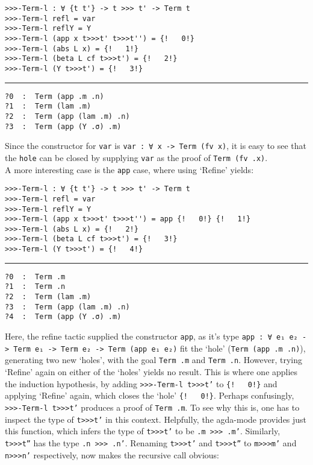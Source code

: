 \documentclass[a4paper, 12pt, twoside]{style/ociamthesis}
\let\OldTexttt\texttt
\renewcommand{\texttt}[1]{\small\OldTexttt{#1}}
\begin{document}
\begin{verbatim}
>>>-Term-l : ∀ {t t'} -> t >>> t' -> Term t
>>>-Term-l refl = var
>>>-Term-l reflY = Y
>>>-Term-l (app x t>>>t' t>>>t'') = {!   0!}
>>>-Term-l (abs L x) = {!   1!}
>>>-Term-l (beta L cf t>>>t') = {!   2!}
>>>-Term-l (Y t>>>t') = {!   3!}
\end{verbatim}

\noindent\rule{8cm}{0.4pt}

\begin{verbatim}
?0  :  Term (app .m .n)
?1  :  Term (lam .m)
?2  :  Term (app (lam .m) .n)
?3  :  Term (app (Y .σ) .m)
\end{verbatim}

Since the constructor for \texttt{var} is
\texttt{var : ∀ {x} -> Term (fv x)}, it is easy to see that the
\texttt{hole} can be closed by supplying \texttt{var} as the proof of
\texttt{Term (fv .x)}.\\
A more interesting case is the \texttt{app} case, where using `Refine'
yields:

\begin{verbatim}
>>>-Term-l : ∀ {t t'} -> t >>> t' -> Term t
>>>-Term-l refl = var
>>>-Term-l reflY = Y
>>>-Term-l (app x t>>>t' t>>>t'') = app {!   0!} {!   1!}
>>>-Term-l (abs L x) = {!   2!}
>>>-Term-l (beta L cf t>>>t') = {!   3!}
>>>-Term-l (Y t>>>t') = {!   4!}
\end{verbatim}

\noindent\rule{8cm}{0.4pt}

\begin{verbatim}
?0  :  Term .m
?1  :  Term .n
?2  :  Term (lam .m)
?3  :  Term (app (lam .m) .n)
?4  :  Term (app (Y .σ) .m)
\end{verbatim}

Here, the refine tactic supplied the constructor \texttt{app}, as it's
type \texttt{app : ∀ {e₁ e₂} -> Term e₁ -> Term e₂ -> Term (app e₁ e₂)}
fit the `hole' (\texttt{Term (app .m .n)}), generating two new `holes',
with the goal \texttt{Term .m} and \texttt{Term .n}. However, trying
`Refine' again on either of the `holes' yields no result. This is where
one applies the induction hypothesis, by adding
\texttt{>>>-Term-l t>>>t'} to \texttt{\{!\ \ \ 0!\}} and applying
`Refine' again, which closes the `hole' \texttt{\{!\ \ \ 0!\}}. Perhaps
confusingly, \texttt{>>>-Term-l t>>>t'} produces a proof of
\texttt{Term .m}. To see why this is, one has to inspect the type of
\texttt{t>>>t'} in this context. Helpfully, the agda-mode provides just
this function, which infers the type of \texttt{t>>>t'} to be
\texttt{.m >>> .m'}. Similarly, \texttt{t>>>t''} has the type
\texttt{.n >>> .n'}. Renaming \texttt{t>>>t'} and \texttt{t>>>t''} to
\texttt{m>>>m'} and \texttt{n>>>n'} respectively, now makes the
recursive call obvious:
\end{document}

